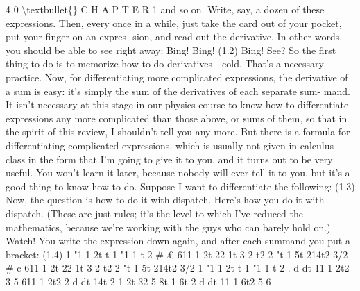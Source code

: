 \documentclass[10pt,oneside]{article}
\begin{document}
4 0 \textbackslash{}textbullet\{\} C H A P T E R  1 and so on. Write, say, a dozen of these expressions. Then, every once in a while, just take the card out of your pocket, put your finger on an expres- sion, and read out the derivative. In other words, you should be able to see right away: Bing! Bing! (1.2) Bing! See? So the first thing to do is to memorize how to do derivatives---cold. That’s a necessary practice. Now, for differentiating more complicated expressions, the derivative of a sum is easy: it’s simply the sum of the derivatives of each separate sum- mand. It isn’t necessary at this stage in our physics course to know how to differentiate expressions any more complicated than those above, or sums of them, so that in the spirit of this review, I shouldn’t tell you any more. But there is a formula for differentiating complicated expressions, which is usually not given in calculus class in the form that I’m going to give it to you, and it turns out to be very useful. You won’t learn it later, because nobody will ever tell it to you, but it’s a good thing to know how to do. Suppose I want to differentiate the following: (1.3) Now, the question is how to do it with dispatch. Here’s how you do it with dispatch. (These are just rules; it’s the level to which I’ve reduced the mathematics, because we’re working with the guys who can barely hold on.) Watch! You write the expression down again, and after each summand you put a bracket: (1.4) 1 "1 1 2t t 1 "1 1 t 2 \# £ 611 1 2t 22 1t 3 2 t2 2 "t 1 5t 214t2 3/2 \# c 611 1 2t 22 1t 3 2 t2 2 "t 1 5t 214t2 3/2 1 "1 1 2t t 1 "1 1 t 2 . d dt 11 1 2t2 3 5 611 1 2t2 2 d dt 14t 2 1 2t 32 5 8t 1 6t 2 d dt 11 1 6t2 5 6\par
\end{document}

